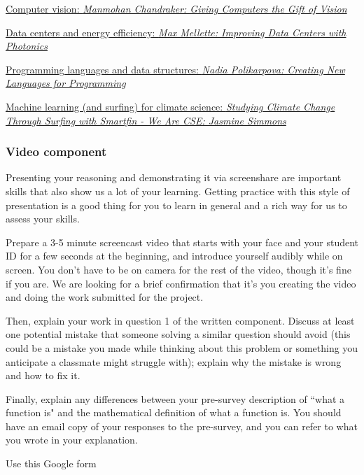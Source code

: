 \begin{enumerate}
\href{https://www.uctv.tv/computer-science/search-details.aspx?showID=33421}{Computer vision: 
{\it Manmohan Chandraker: Giving Computers the Gift of Vision}}

\href{https://www.uctv.tv/computer-science/search-details.aspx?showID=33423}{Data centers and energy efficiency:
{\it  Max Mellette: Improving Data Centers with Photonics}}

\href{https://www.uctv.tv/computer-science/search-details.aspx?showID=33420}{Programming languages 
and data structures: {\it Nadia Polikarpova: Creating New Languages for Programming}}

\href{https://www.uctv.tv/computer-science/search-details.aspx?showID=34350}{Machine learning (and surfing) 
for climate science: {\it Studying Climate Change Through Surfing with Smartfin - We Are CSE: Jasmine Simmons}}
\end{enumerate}
\subsubsection*{Video component}
Presenting your reasoning and demonstrating it via screenshare are important 
skills that also show us a lot of your learning. Getting practice with this style of 
presentation is a good thing for you to learn in general and a rich way for us to assess your skills. 

Prepare a 3-5 minute screencast video that starts with 
your face and your student ID for a few seconds at the beginning, and introduce yourself audibly while on screen. 
You don't have to be on camera for the rest of the video, though it's fine if you are. 
We are looking for a brief confirmation that it's you creating the video and doing the work 
submitted for the project.

Then, explain your work in question 1 of the written component.
Discuss at least one potential mistake that someone solving 
a similar question should avoid (this could be a mistake you made while thinking about this 
problem or something you anticipate a classmate might struggle with); explain why the 
mistake is wrong and how to fix it.

Finally, explain any differences between your pre-survey description 
of ``what a function is" and the mathematical definition of what a function is. 
You should have an email copy of your responses to the pre-survey, 
and you can refer to what you wrote in your explanation.

Use this Google form

